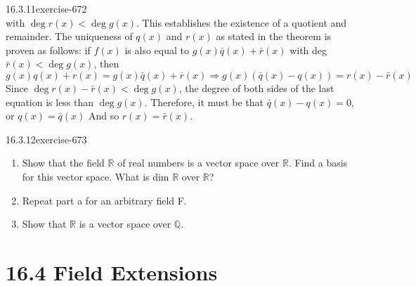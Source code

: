 \documentclass[twoside,10pt,]{book}
\numberwithin{equation}{section}
\begin{document}
\begin{divisionsolution}{16.3.11}{}{exercise-672}
\begin{equation*}
\end{equation*}
with  \(\deg  r(x) < \deg  g(x)\).  This establishes the existence of a quotient and remainder. The uniqueness of \(q(x)\) and \(r(x)\) as stated in the theorem is proven as follows: if \(f(x)\) is also equal to \(g(x)\bar{q}(x) + \bar{r}(x)\) with deg \(\bar{r}(x) < \deg  g(x)\), then%
\begin{equation*}
g(x)q(x) + r(x) = g(x) \bar{q}(x) +\overline{ r}(x) \Rightarrow  g(x) \left(\bar{q}(x)-q(x)\right)= r(x)-\bar{r}(x)
\end{equation*}
Since \(\deg  r(x) - \bar{r}(x) < \deg  g(x)\), the degree of both sides of the last equation is less than \(\deg  g(x)\). Therefore, it must be that \(\bar{q}(x) - q(x) = 0\), or \(q(x) =\bar{q}(x)\) And so \(r(x) = \bar{r}(x)\).%
\end{divisionsolution}%
\begin{divisionsolution}{16.3.12}{}{exercise-673}%
\hypertarget{p-6012}{}%
\leavevmode%
\begin{enumerate}[label=(\alph*)]
\item\hypertarget{li-2660}{}\hypertarget{p-6013}{}%
Show that the field \(\mathbb{R}\) of real numbers is a vector space over \(\mathbb{R}\). Find a basis for this vector space. What is dim \(\mathbb{R}\) over \(\mathbb{R}\)?%
\item\hypertarget{li-2661}{}\hypertarget{p-6014}{}%
Repeat part a for an arbitrary field F.%
\item\hypertarget{li-2662}{}\hypertarget{p-6015}{}%
Show that \(\mathbb{R}\) is a vector space over \(\mathbb{Q}\).%
\end{enumerate}
%
\end{divisionsolution}%
\section*{16.4 Field Extensions}
\end{document}
